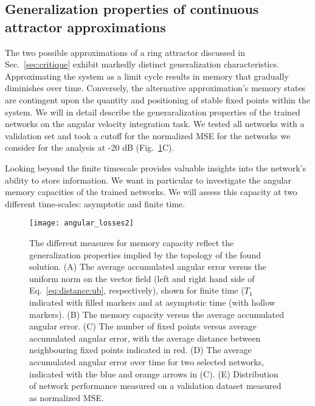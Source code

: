 \documentclass{article} %
\newcounter{ct}
\theoremstyle{definition}
\theoremstyle{remark}
\begin{document}
\subsection{Generalization properties of continuous attractor approximations}\label{sec:generalization}

The two possible approximations of a ring attractor discussed in Sec.~\ref{sec:critique} exhibit markedly distinct generalization characteristics.
Approximating the system as a limit cycle results in memory that gradually diminishes over time.
Conversely, the alternative approximation's memory states are contingent upon the quantity and positioning of stable fixed points within the system.
We will in detail describe the generaralization properties of the trained networks on the angular velocity integration task.
We tested all networks with a validation set and took a cutoff for the normalized MSE for the networks we consider for the analysis at -20 dB (Fig.~\ref{fig:angular_loss}C).

Looking beyond the finite timescale provides valuable insights into the network's ability to store information.
We want in particular to investigate the angular memory capacities of the trained networks.
We will assess this capacity at two different time-scales:  asymptotic and finite time.


\begin{figure}[tbhp]
  \centering
  \texttt{[image: angular\_losses2]}
  \caption{The different measures for memory capacity reflect the generalization properties implied by the topology of the found solution.
  (A) The average accumulated angular error versus the uniform norm on the vector field (left and right hand side of Eq.~\ref{eq:distance:ub}, respectively), shown for finite time ($T_1$ indicated with filled markers and at asymptotic time (with hollow markers).
  (B) The memory capacity versus the average accumulated angular error.
  (C) The number of fixed points versus average accumulated angular error, with the average distance between neighbouring fixed points indicated in red.
  (D) The  average accumulated angular error over time for two selected networks, indicated with the blue and orange arrows in (C).
  (E) Distribution of network performance measured on a validation dataset measured as normalized MSE.
  }
  \label{fig:angular_loss}
\end{figure}
\end{document}
